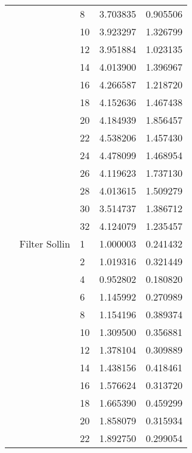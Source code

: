 \begin{tabular}{lllrr}
                      &            & 8  &  3.703835 &  0.905506 \\
                      &            & 10 &  3.923297 &  1.326799 \\
                      &            & 12 &  3.951884 &  1.023135 \\
                      &            & 14 &  4.013900 &  1.396967 \\
                      &            & 16 &  4.266587 &  1.218720 \\
                      &            & 18 &  4.152636 &  1.467438 \\
                      &            & 20 &  4.184939 &  1.856457 \\
                      &            & 22 &  4.538206 &  1.457430 \\
                      &            & 24 &  4.478099 &  1.468954 \\
                      &            & 26 &  4.119623 &  1.737130 \\
                      &            & 28 &  4.013615 &  1.509279 \\
                      &            & 30 &  3.514737 &  1.386712 \\
                      &            & 32 &  4.124079 &  1.235457 \\
                      & Filter Sollin & 1  &  1.000003 &  0.241432 \\
                      &            & 2  &  1.019316 &  0.321449 \\
                      &            & 4  &  0.952802 &  0.180820 \\
                      &            & 6  &  1.145992 &  0.270989 \\
                      &            & 8  &  1.154196 &  0.389374 \\
                      &            & 10 &  1.309500 &  0.356881 \\
                      &            & 12 &  1.378104 &  0.309889 \\
                      &            & 14 &  1.438156 &  0.418461 \\
                      &            & 16 &  1.576624 &  0.313720 \\
                      &            & 18 &  1.665390 &  0.459299 \\
                      &            & 20 &  1.858079 &  0.315934 \\
                      &            & 22 &  1.892750 &  0.299054 \\

\end{tabular}

